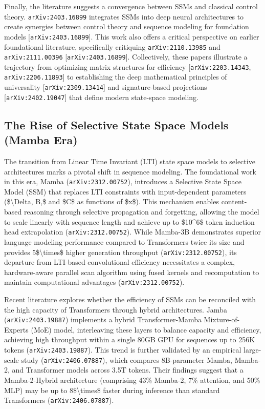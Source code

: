 \documentclass[11pt]{article}
\begin{document}
Finally, the literature suggests a convergence between SSMs and classical control theory. \texttt{arXiv:2403.16899} integrates SSMs into deep neural architectures to create synergies between control theory and sequence modeling for foundation models [\texttt{arXiv:2403.16899}]. This work also offers a critical perspective on earlier foundational literature, specifically critiquing \texttt{arXiv:2110.13985} and \texttt{arXiv:2111.00396} [\texttt{arXiv:2403.16899}]. Collectively, these papers illustrate a trajectory from optimizing matrix structures for efficiency [\texttt{arXiv:2203.14343}, \texttt{arXiv:2206.11893}] to establishing the deep mathematical principles of universality [\texttt{arXiv:2309.13414}] and signature-based projections [\texttt{arXiv:2402.19047}] that define modern state-space modeling.

\subsection{The Rise of Selective State Space Models (Mamba Era)}

The transition from Linear Time Invariant (LTI) state space models to selective architectures marks a pivotal shift in sequence modeling. The foundational work in this era, Mamba (\texttt{arXiv:2312.00752}), introduces a Selective State Space Model (SSM) that replaces LTI constraints with input-dependent parameters (\$\textbackslash{}Delta, B,\$ and \$C\$ as functions of \$x\$). This mechanism enables content-based reasoning through selective propagation and forgetting, allowing the model to scale linearly with sequence length and achieve up to \$10\textasciicircum{}6\$ token induction head extrapolation (\texttt{arXiv:2312.00752}). While Mamba-3B demonstrates superior language modeling performance compared to Transformers twice its size and provides 5\$\textbackslash{}times\$ higher generation throughput (\texttt{arXiv:2312.00752}), its departure from LTI-based convolutional efficiency necessitates a complex, hardware-aware parallel scan algorithm using fused kernels and recomputation to maintain computational advantages (\texttt{arXiv:2312.00752}).

Recent literature explores whether the efficiency of SSMs can be reconciled with the high capacity of Transformers through hybrid architectures. Jamba (\texttt{arXiv:2403.19887}) implements a hybrid Transformer-Mamba Mixture-of-Experts (MoE) model, interleaving these layers to balance capacity and efficiency, achieving high throughput within a single 80GB GPU for sequences up to 256K tokens (\texttt{arXiv:2403.19887}). This trend is further validated by an empirical large-scale study (\texttt{arXiv:2406.07887}), which compares 8B-parameter Mamba, Mamba-2, and Transformer models across 3.5T tokens. Their findings suggest that a Mamba-2-Hybrid architecture (comprising 43\% Mamba-2, 7\% attention, and 50\% MLP) may be up to 8\$\textbackslash{}times\$ faster during inference than standard Transformers (\texttt{arXiv:2406.07887}).
\end{document}
